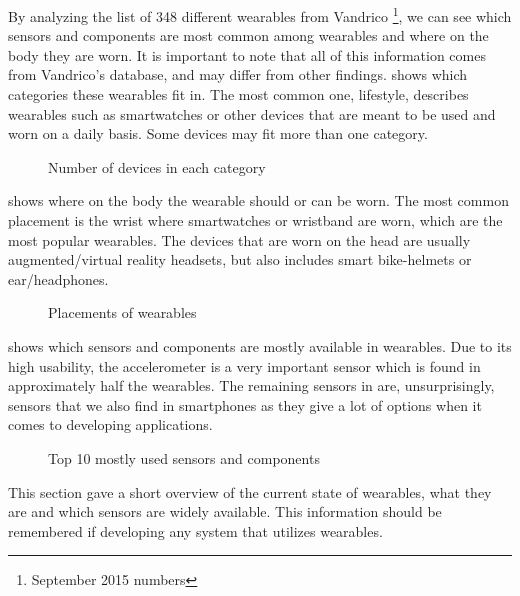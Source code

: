 By analyzing the list of 348 different wearables from Vandrico \cite{LISTOFWEARABLES}\footnote{September 2015 numbers}, 
we can see which sensors and components are most common among wearables and where on the body they are worn. 
It is important to note that all of this information comes from Vandrico's database, and may differ from other findings. 
 shows which categories these wearables fit in. 
The most common one, lifestyle, describes wearables such as smartwatches or other devices that are meant to be used and worn on a daily basis. 
Some devices may fit more than one category.

\begin{figure}[!htb]
    \centering
    
    \caption{Number of devices in each category}
    \label{fig:wearables-category}
\end{figure}

 shows where on the body the wearable should or can be worn. 
The most common placement is the wrist where smartwatches or wristband are worn, 
which are the most popular wearables. 
The devices that are worn on the head are usually augmented/virtual reality headsets, 
but also includes smart bike-helmets or ear/headphones.

\begin{figure}[!htb]
    \centering
    
    \caption{Placements of wearables}
    \label{fig:wearables-placement}
\end{figure}

 shows which sensors and components are mostly available in wearables. 
Due to its high usability, the accelerometer is a very important sensor which is found in approximately half the wearables. 
The remaining sensors in  are, unsurprisingly, sensors that we also find in smartphones as they give a lot of options when it comes to developing applications. 
\begin{figure}[!htb]
    \centering
    
    \caption{Top 10 mostly used sensors and components}
    \label{fig:wearables-sensors}
\end{figure}

This section gave a short overview of the current state of wearables, what they are and which sensors are widely available. 
This information should be remembered if developing any system that utilizes wearables. 

